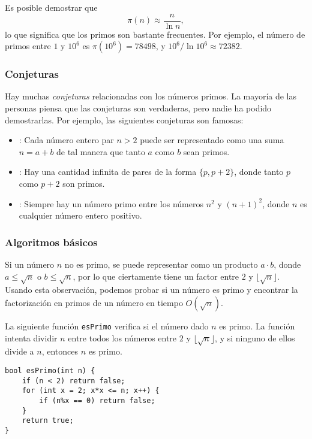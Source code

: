 Es posible demostrar que
\[\pi(n) \approx \frac{n}{\ln n},\]
lo que significa que los primos son bastante frecuentes.
Por ejemplo, el número de primos entre
$1$ y $10^6$ es $\pi(10^6)=78498$,
y $10^6 / \ln 10^6 \approx 72382$.

\subsubsection{Conjeturas}

Hay muchas \emph{conjeturas} relacionadas con los números primos.
La mayoría de las personas piensa que las conjeturas son verdaderas,
pero nadie ha podido demostrarlas.
Por ejemplo, las siguientes conjeturas son famosas:

\begin{itemize}
\item {}:
Cada número entero par $n>2$ puede ser representado como una
suma $n=a+b$ de tal manera que tanto $a$ como $b$ sean primos.
\item {}:
Hay una cantidad infinita de pares
de la forma $\{p,p+2\}$,
donde tanto $p$ como $p+2$ son primos.
\item {}:
Siempre hay un número primo entre los números
$n^2$ y $(n+1)^2$, donde $n$ es cualquier número entero positivo.
\end{itemize}

\subsubsection{Algoritmos básicos}

Si un número $n$ no es primo,
se puede representar como un producto $a \cdot b$,
donde $a \le \sqrt n$ o $b \le \sqrt n$,
por lo que ciertamente tiene un factor entre $2$ y $\lfloor \sqrt n \rfloor$.
Usando esta observación, podemos probar
si un número es primo y encontrar la factorización en primos
de un número en tiempo $O(\sqrt n)$.

La siguiente función \texttt{esPrimo} verifica
si el número dado $n$ es primo.
La función intenta dividir $n$ entre
todos los números entre $2$ y $\lfloor \sqrt n \rfloor$,
y si ninguno de ellos divide a $n$, entonces $n$ es primo.

\begin{lstlisting}
bool esPrimo(int n) {
    if (n < 2) return false;
    for (int x = 2; x*x <= n; x++) {
        if (n%x == 0) return false;
    }
    return true;
}
\end{lstlisting}

